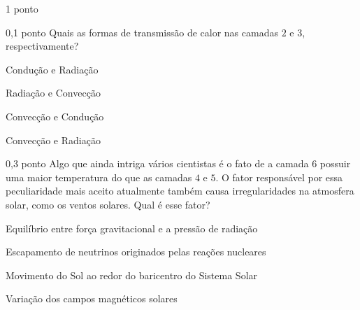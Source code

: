 \documentclass{../lista}
\begin{document}
\begin{questao}{1 ponto}
		\begin{pergunta}{0,1 ponto}
			Quais as formas de transmissão de calor nas camadas $2$ e $3$, respectivamente?
			\begin{alternativas}
				\item Condução e Radiação
				\item Radiação e Convecção
				\item Convecção e Condução
				\item Convecção e Radiação
			\end{alternativas}
		\end{pergunta}

		\begin{pergunta}{0,3 ponto}
			Algo que ainda intriga vários cientistas é o fato de a camada $6$ possuir uma maior temperatura do que as camadas $4$ e $5$. O fator responsável por essa peculiaridade mais aceito atualmente também causa irregularidades na atmosfera solar, como os ventos solares. Qual é esse fator?
			\begin{alternativas}
				\item Equilíbrio entre força gravitacional e a pressão de radiação
				\item Escapamento de neutrinos originados pelas reações nucleares
				\item Movimento do Sol ao redor do baricentro do Sistema Solar
				\item Variação dos campos magnéticos solares
			\end{alternativas}
		\end{pergunta}
	\end{questao}
\end{document}
